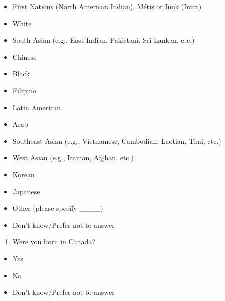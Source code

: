 \documentclass[
  letterpaper,
  DIV=11,
  numbers=noendperiod]{scrreprt}
\providecommand{\tightlist}{%
  \setlength{\itemsep}{0pt}\setlength{\parskip}{0pt}}\usepackage{longtable,booktabs,array}
\begin{document}
\begin{itemize}
\tightlist
\item
  First Nations (North American Indian), Métis or Inuk (Inuit)
\item
  White
\item
  South Asian (e.g., East Indian, Pakistani, Sri Lankan, etc.)
\item
  Chinese
\item
  Black
\item
  Filipino
\item
  Latin American
\item
  Arab
\item
  Southeast Asian (e.g., Vietnamese, Cambodian, Laotian, Thai, etc.)
\item
  West Asian (e.g., Iranian, Afghan, etc.)
\item
  Korean
\item
  Japanese
\item
  Other (please specify \_\_\_\_)
\item
  Don't know/Prefer not to answer
\end{itemize}

\begin{enumerate}
\def\labelenumi{\arabic{enumi}.}
\setcounter{enumi}{18}
\tightlist
\item
  Were you born in Canada?
\end{enumerate}

\begin{itemize}
\tightlist
\item
  Yes
\item
  No
\item
  Don't know/Prefer not to answer
\end{itemize}
\end{document}
